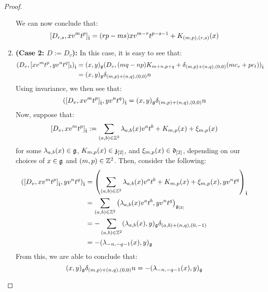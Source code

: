 \begin{proof}
\begin{enumerate}
                    We can now conclude that:
                        $$[D_{r, s}, x v^m t^p]_{\hat{\mathfrak{t}}} = ( rp - ms ) x v^{m - r} t^{p - s - 1} + K_{(m, p), (r, s)}(x)$$
                    \item \textbf{(Case 2: $D := D_v$):} In this case, it is easy to see that:
                        $$
                            \begin{aligned}
                                ( D_v, [x v^m t^p, y v^n t^q]_{\mathfrak{t}} )_{\hat{\mathfrak{t}}} & = (x, y)_{\mathfrak{g}} ( D_v, (mq - np) K_{m + n, p + q} + \delta_{(m, p) + (n, q), (0, 0)} ( m c_v + p c_t ) )_{\hat{\mathfrak{t}}}
                                \\
                                & = (x, y)_{\mathfrak{g}} \delta_{(m, p) + (n, q), (0, 0)} n
                            \end{aligned}
                        $$
                    Using invariance, we then see that:
                        $$( [D_v, x v^m t^p]_{\hat{\mathfrak{t}}}, y v^n t^q )_{\hat{\mathfrak{t}}} = (x, y)_{\mathfrak{g}} \delta_{(m, p) + (n, q), (0, 0)} n$$
                    Now, suppose that:
                        $$[D_v, x v^m t^p]_{\hat{\mathfrak{t}}} := \sum_{(a, b) \in \mathbb{Z}^2} \lambda_{a, b}(x) v^a t^b + K_{m, p}(x) + \xi_{m, p}(x)$$
                    for some $\lambda_{a, b}(x) \in \mathfrak{g}$, $K_{m, p}(x) \in \mathfrak{z}_{[2]}$, and $\xi_{m, p}(x) \in \mathfrak{d}_{[2]}$, depending on our choices of $x \in \mathfrak{g}$ and $(m, p) \in \mathbb{Z}^2$. Then, consider the following:
                        $$
                            \begin{aligned}
                                ( [D_v, x v^m t^p]_{\hat{\mathfrak{t}}}, y v^n t^q )_{\hat{\mathfrak{t}}} & = \left( \sum_{(a, b) \in \mathbb{Z}^2} \lambda_{a, b}(x) v^a t^b + K_{m, p}(x) + \xi_{m, p}(x), y v^n t^q \right)_{\hat{\mathfrak{t}}}
                                \\
                                & = \sum_{(a, b) \in \mathbb{Z}^2} \left( \lambda_{a, b}(x) v^a t^b, y v^n t^q \right)_{\mathfrak{g}_{[2]}}
                                \\
                                & = -\sum_{(a, b) \in \mathbb{Z}^2} (\lambda_{a, b}(x), y)_{\mathfrak{g}} \delta_{ (a, b) + (n, q), (0, -1) }
                                \\
                                & = -(\lambda_{-n, -q - 1}(x), y)_{\mathfrak{g}}
                            \end{aligned}
                        $$
                    From this, we are able to conclude that:
                        $$(x, y)_{\mathfrak{g}} \delta_{(m, p) + (n, q), (0, 0)} n = -(\lambda_{-n, -q - 1}(x), y)_{\mathfrak{g}}$$

\end{enumerate}
\end{proof}
